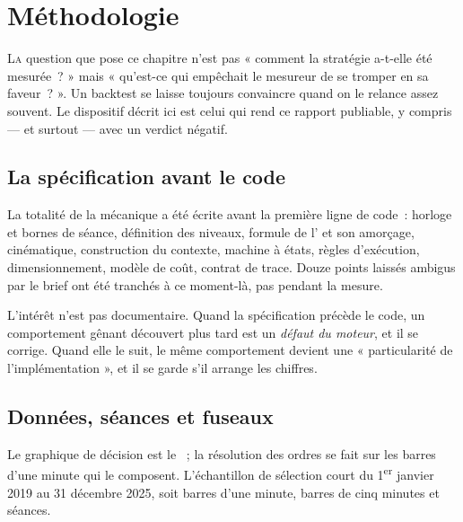 \section{Méthodologie}
\label{sec:x10_methodologie}

\lettrine[lines=2, findent=2pt, nindent=0pt]{L}{a} question que pose ce
chapitre n'est pas « comment la stratégie a-t-elle été mesurée~? » mais
« qu'est-ce qui empêchait le mesureur de se tromper en sa faveur~? ». Un
backtest se laisse toujours convaincre quand on le relance assez souvent. Le
dispositif décrit ici est celui qui rend ce rapport publiable, y compris ---
et surtout --- avec un verdict négatif.

\subsection{La spécification avant le code}

La totalité de la mécanique a été écrite avant la première ligne de code~:
horloge et bornes de séance, définition des niveaux, formule de l'
et son amorçage, cinématique, construction du contexte, machine à états,
règles d'exécution, dimensionnement, modèle de coût, contrat de trace. Douze
points laissés ambigus par le brief ont été tranchés à ce moment-là, pas
pendant la mesure.

L'intérêt n'est pas documentaire. Quand la spécification précède le code, un
comportement gênant découvert plus tard est un \emph{défaut du moteur}, et il
se corrige. Quand elle le suit, le même comportement devient une
« particularité de l'implémentation », et il se garde s'il arrange les
chiffres.

\subsection{Données, séances et fuseaux}

Le graphique de décision est le ~; la résolution des ordres se fait
sur les barres d'une minute qui le composent. L'échantillon de sélection court
du 1\textsuperscript{er} janvier 2019 au 31 décembre 2025, soit
\XTenSampleBarsMOne{} barres d'une minute, \XTenSampleBarsMFive{} barres de cinq
minutes et \XTenSampleSessions{} séances.

